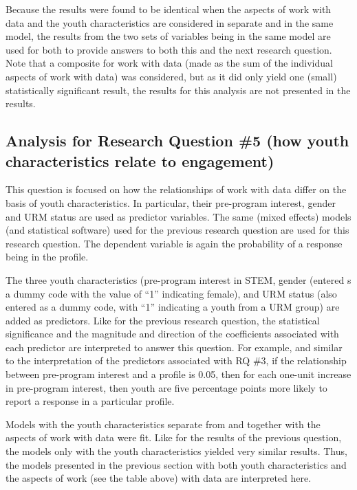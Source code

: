 \documentclass[]{msu-thesis}
\theoremstyle{definition}
\theoremstyle{definition}
\theoremstyle{definition}
\theoremstyle{remark}
\begin{document}
Because the results were found to be identical when the aspects of work
with data and the youth characteristics are considered in separate and
in the same model, the results from the two sets of variables being in
the same model are used for both to provide answers to both this and the
next research question. Note that a composite for work with data (made
as the sum of the individual aspects of work with data) was considered,
but as it did only yield one (small) statistically significant result,
the results for this analysis are not presented in the results.

\subsection{Analysis for Research Question \#5 (how youth
characteristics relate to
engagement)}\label{analysis-for-research-question-5-how-youth-characteristics-relate-to-engagement}

This question is focused on how the relationships of work with data
differ on the basis of youth characteristics. In particular, their
pre-program interest, gender and URM status are used as predictor
variables. The same (mixed effects) models (and statistical software)
used for the previous research question are used for this research
question. The dependent variable is again the probability of a response
being in the profile.

The three youth characteristics (pre-program interest in STEM, gender
(entered s a dummy code with the value of ``1'' indicating female), and
URM status (also entered as a dummy code, with ``1'' indicating a youth
from a URM group) are added as predictors. Like for the previous
research question, the statistical significance and the magnitude and
direction of the coefficients associated with each predictor are
interpreted to answer this question. For example, and similar to the
interpretation of the predictors associated with RQ \#3, if the
relationship between pre-program interest and a profile is 0.05, then
for each one-unit increase in pre-program interest, then youth are five
percentage points more likely to report a response in a particular
profile.

Models with the youth characteristics separate from and together with
the aspects of work with data were fit. Like for the results of the
previous question, the models only with the youth characteristics
yielded very similar results. Thus, the models presented in the previous
section with both youth characteristics and the aspects of work (see the
table above) with data are interpreted here.
\end{document}
